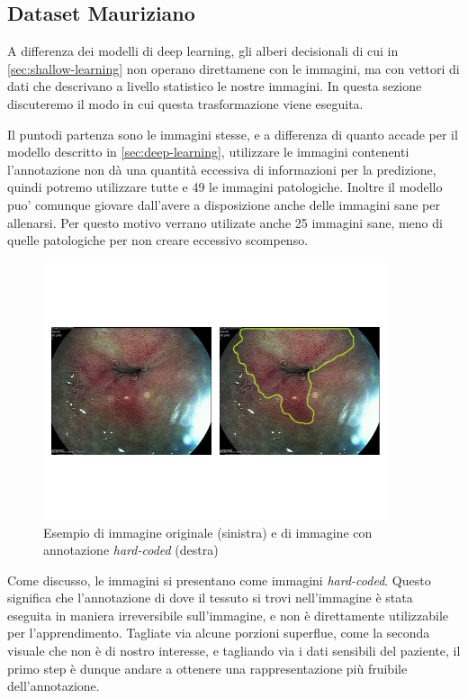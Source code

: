 \subsection{\label{sec:dataset-mauriziano}Dataset Mauriziano}

A differenza dei modelli di deep learning, gli alberi decisionali
di cui in \ref{sec:shallow-learning} non operano direttamene
con le immagini, ma con vettori di dati che descrivano a livello
statistico le nostre immagini.
In questa sezione discuteremo il modo in cui questa trasformazione
viene eseguita.

Il puntodi partenza sono le immagini stesse, e a differenza di
quanto accade per il modello descritto in \ref{sec:deep-learning},
utilizzare le immagini contenenti l'annotazione non dà una
quantità eccessiva di informazioni per la predizione, quindi
potremo utilizzare tutte e 49 le immagini patologiche.
Inoltre il modello puo' comunque giovare dall'avere a disposizione
anche delle immagini sane per allenarsi. Per questo motivo verrano
utilizate anche 25 immagini sane, meno di quelle patologiche per
non creare eccessivo scompenso.

\begin{figure}
    \includegraphics[width=0.9\textwidth]{./assets/side-by-side.png}
    \caption{\label{fig:side-by-side}Esempio di immagine originale (sinistra) e
    di immagine con annotazione {\it hard-coded} (destra)}
\end{figure}

Come discusso, le immagini si presentano come immagini {\it hard-coded}.
Questo significa che l'annotazione di dove il tessuto si trovi
nell'immagine è stata eseguita in maniera irreversibile sull'immagine,
e non è direttamente utilizzabile per l'apprendimento.
Tagliate via alcune porzioni superflue, come la seconda visuale che
non è di nostro interesse, e tagliando via i dati sensibili del paziente,
il primo step è dunque andare a ottenere una rappresentazione più
fruibile dell'annotazione.


